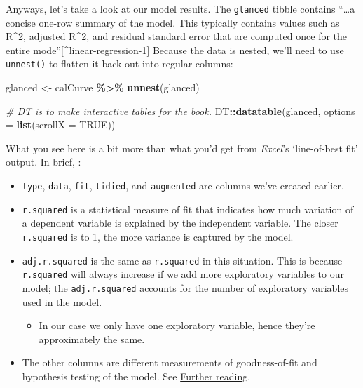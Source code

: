 \documentclass[
]{book}
\newenvironment{Shaded}{\begin{snugshade}}{\end{snugshade}}
\newcommand{\AttributeTok}[1]{\textcolor[rgb]{0.13,0.29,0.53}{#1}}
\newcommand{\CommentTok}[1]{\textcolor[rgb]{0.56,0.35,0.01}{\textit{#1}}}
\newcommand{\ConstantTok}[1]{\textcolor[rgb]{0.56,0.35,0.01}{#1}}
\newcommand{\FunctionTok}[1]{\textcolor[rgb]{0.13,0.29,0.53}{\textbf{#1}}}
\newcommand{\NormalTok}[1]{#1}
\newcommand{\OtherTok}[1]{\textcolor[rgb]{0.56,0.35,0.01}{#1}}
\newcommand{\SpecialCharTok}[1]{\textcolor[rgb]{0.81,0.36,0.00}{\textbf{#1}}}
\providecommand{\tightlist}{%
  \setlength{\itemsep}{0pt}\setlength{\parskip}{0pt}}
\begin{document}
Anyways, let's take a look at our model results. The \texttt{glanced} tibble contains ``\ldots a concise one-row summary of the model. This typically contains values such as R\^{}2, adjusted R\^{}2, and residual standard error that are computed once for the entire mode''{[}\^{}linear-regression-1{]} Because the data is nested, we'll need to use \texttt{unnest()} to flatten it back out into regular columns:

\begin{Shaded}
\begin{Highlighting}[]
\NormalTok{glanced }\OtherTok{\textless{}{-}}\NormalTok{ calCurve }\SpecialCharTok{\%\textgreater{}\%}
  \FunctionTok{unnest}\NormalTok{(glanced)}

\CommentTok{\# DT is to make interactive tables for the book.}
\NormalTok{DT}\SpecialCharTok{::}\FunctionTok{datatable}\NormalTok{(glanced, }
              \AttributeTok{options =} \FunctionTok{list}\NormalTok{(}\AttributeTok{scrollX =} \ConstantTok{TRUE}\NormalTok{))}
\end{Highlighting}
\end{Shaded}

What you see here is a bit more than what you'd get from \emph{Excel}'s `line-of-best fit' output. In brief, :

\begin{itemize}
\tightlist
\item
  \texttt{type}, \texttt{data}, \texttt{fit}, \texttt{tidied}, and \texttt{augmented} are columns we've created earlier.
\item
  \texttt{r.squared} is a statistical measure of fit that indicates how much variation of a dependent variable is explained by the independent variable. The closer \texttt{r.squared} is to 1, the more variance is captured by the model.
\item
  \texttt{adj.r.squared} is the same as \texttt{r.squared} in this situation. This is because \texttt{r.squared} will always increase if we add more exploratory variables to our model; the \texttt{adj.r.squared} accounts for the number of exploratory variables used in the model.

  \begin{itemize}
  \tightlist
  \item
    In our case we only have one exploratory variable, hence they're approximately the same.
  \end{itemize}
\item
  The other columns are different measurements of goodness-of-fit and hypothesis testing of the model. See \protect\hyperlink{further-reading}{Further reading}.
\end{itemize}
\end{document}
